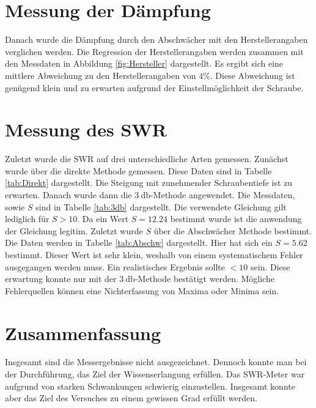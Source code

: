 \section{Messung der Dämpfung}
Danach wurde die Dämpfung durch den Abschwächer mit den Herstellerangaben verglichen werden. Die Regression der Herstellerangaben werden zusammen mit den Messdaten in Abbildung 
\ref{fig:Hersteller} dargestellt. Es ergibt sich eine mittlere Abweichung zu den Herstellerangaben von $4\%$. Diese Abweichung ist genügend klein und zu erwarten aufgrund der 
Einstellmöglichkeit der Schraube.
\section{Messung des SWR}
Zuletzt wurde die SWR auf drei unterschiedliche Arten gemessen. Zunächst wurde über die direkte Methode gemessen. Diese Daten sind in Tabelle \ref{tab:Direkt} dargestellt. Die Steigung
mit zunehmender Schraubentiefe ist zu erwarten. Danach wurde dann die $\qty{3}{\decibel}$-Methode angewendet. Die Messdaten, sowie $S$ sind in Tabelle \ref{tab:3db} dargestellt. Die
verwendete Gleichung gilt lediglich für $S>10$. Da ein Wert $S = \num{12.24}$ bestimmt wurde ist die anwendung der Gleichung legitim. 
Zuletzt wurde $S$ über die Abschwächer Methode bestimmt. Die Daten werden in Tabelle \ref{tab:Abschw} dargestellt. Hier hat sich ein $S = \num{5.62}$ bestimmt. Dieser Wert ist sehr 
klein, weshalb von einem systematischem Fehler ausgegangen werden muss. Ein realistisches Ergebnis sollte $< 10$ sein. Diese erwartung konnte nur mit der $\qty{3}{\decibel}$-Methode
bestätigt werden. Mögliche Fehlerquellen können eine Nichterfassung von Maxima oder Minima sein.
\section{Zusammenfassung}
Insgesamt sind die Messergebnisse nicht ausgezeichnet. Dennoch konnte man bei der Durchführung, das Ziel der Wissenserlangung erfüllen. Das SWR-Meter war aufgrund von starken
Schwankungen schwierig einzustellen. Insgesamt konnte aber das Ziel des Versuches zu einem gewissen Grad erfüllt werden. 


